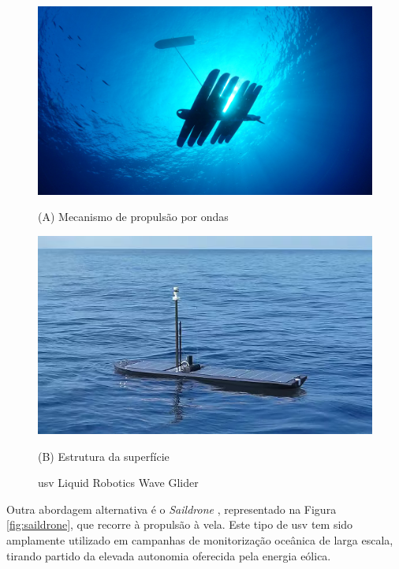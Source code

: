 \begin{figure}[H]
    \centering
    \begin{minipage}{0.45\linewidth}
        \centering
        \includegraphics[width=\linewidth]{figuras/wave-glider.jpg}
        \caption*{(A) Mecanismo de propulsão por ondas}
    \end{minipage}
    \hfill
    \begin{minipage}{0.45\linewidth}
        \centering
        \includegraphics[width=\linewidth]{figuras/wave-glider2.png}
        \caption*{(B) Estrutura da superfície}
    \end{minipage}
    \caption[\gls{usv} Liquid Robotics Wave Glider]{\gls{usv} Liquid Robotics Wave Glider \cite{wave-glider}}
    \label{fig:wave-glider}
\end{figure}

Outra abordagem alternativa é o \emph{Saildrone} \cite{saildrone}, representado na Figura \ref{fig:saildrone}, que recorre à propulsão à vela. Este tipo de \gls{usv} tem sido amplamente utilizado em campanhas de monitorização oceânica de larga escala, tirando partido da elevada autonomia oferecida pela energia eólica.  

